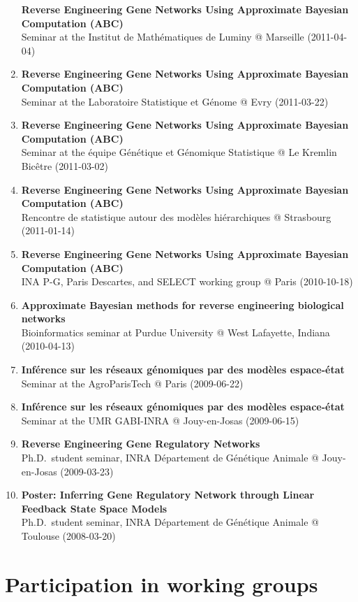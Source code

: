 \documentclass[11pt, a4paper]{awesome-cv}
\begin{document}
\begin{enumerate}
  \textbf{Reverse Engineering Gene Networks Using Approximate Bayesian
  Computation (ABC)}\\
  Seminar at the Institut de Mathématiques de Luminy @ Marseille
  (2011-04-04)
\item
  \textbf{Reverse Engineering Gene Networks Using Approximate Bayesian
  Computation (ABC)}\\
  Seminar at the Laboratoire Statistique et Génome @ Evry (2011-03-22)
\item
  \textbf{Reverse Engineering Gene Networks Using Approximate Bayesian
  Computation (ABC)}\\
  Seminar at the équipe Génétique et Génomique Statistique @ Le Kremlin
  Bicêtre (2011-03-02)
\item
  \textbf{Reverse Engineering Gene Networks Using Approximate Bayesian
  Computation (ABC)}\\
  Rencontre de statistique autour des modèles hiérarchiques @ Strasbourg
  (2011-01-14)
\item
  \textbf{Reverse Engineering Gene Networks Using Approximate Bayesian
  Computation (ABC)}\\
  INA P-G, Paris Descartes, and SELECT working group @ Paris
  (2010-10-18)
\item
  \textbf{Approximate Bayesian methods for reverse engineering
  biological networks}\\
  Bioinformatics seminar at Purdue University @ West Lafayette, Indiana
  (2010-04-13)
\item
  \textbf{Inférence sur les réseaux génomiques par des modèles
  espace-état}\\
  Seminar at the AgroParisTech @ Paris (2009-06-22)
\item
  \textbf{Inférence sur les réseaux génomiques par des modèles
  espace-état}\\
  Seminar at the UMR GABI-INRA @ Jouy-en-Josas (2009-06-15)
\item
  \textbf{Reverse Engineering Gene Regulatory Networks}\\
  Ph.D.~student seminar, INRA Département de Génétique Animale @
  Jouy-en-Josas (2009-03-23)
\item
  \textbf{Poster: Inferring Gene Regulatory Network through Linear
  Feedback State Space Models}\\
  Ph.D.~student seminar, INRA Département de Génétique Animale @
  Toulouse (2008-03-20)
\end{enumerate}

\hypertarget{participation-in-working-groups}{%
\section{Participation in working
groups}\label{participation-in-working-groups}}
\end{document}
